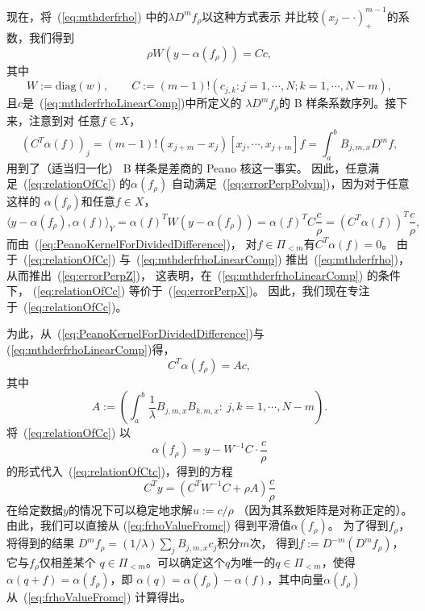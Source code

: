 现在，将~(\ref{eq:mthderfrho}) 中的$\lambda D^{m}f_{\rho}$以这种方式表示
并比较$(x_{j}-\cdot)_{+}^{m-1}$的系数，我们得到
\begin{equation}
  \label{eq:relationOfCc}
  \rho W(y-\alpha(f_{\rho}))=Cc,
\end{equation}
其中
\begin{displaymath}
  W:=\text{diag}(w),\qquad
  C:=(m-1)!(c_{j,k}:j=1,\cdots,N;k=1,\cdots,N-m),
\end{displaymath}
且$c$是~(\ref{eq:mthderfrhoLinearComp})中所定义的
$\lambda D^{m}f_{\rho}$的 B 样条系数序列。接下来，注意到对
任意$f\in X$，
\begin{equation}
  \label{eq:PeanoKernelForDividedDifference}
  (C^{T}\alpha(f))_{j}
  =(m-1)!(x_{j+m}-x_{j})[x_{j},\cdots,x_{j+m}]f
  =\int_{a}^{b}B_{j,m,x}D^{m}f,
\end{equation}
用到了（适当归一化） B 样条是差商的 Peano 核这一事实。
因此，任意满足~(\ref{eq:relationOfCc}) 的$\alpha(f_{\rho})$
自动满足~(\ref{eq:errorPerpPolym})，因为对于任意这样的
$\alpha(f_{\rho})$和任意$f\in X$，
\begin{displaymath}
  \langle y-\alpha(f_{\rho}),\alpha(f) \rangle_{Y}
  =\alpha(f)^{T}W(y-\alpha(f_{\rho}))
  =\alpha(f)^{T}C \frac{c}{\rho}
  =(C^{T}\alpha(f))^{T}\frac{c}{\rho},
\end{displaymath}
而由~(\ref{eq:PeanoKernelForDividedDifference})，
对$f\in\Pi_{<m}$有$C^{T}\alpha(f)=0$。
由于~(\ref{eq:relationOfCc}) 与~(\ref{eq:mthderfrhoLinearComp})
推出~(\ref{eq:mthderfrho})，从而推出~(\ref{eq:errorPerpZ})，
这表明，在~(\ref{eq:mthderfrhoLinearComp}) 的条件下，
(\ref{eq:relationOfCc}) 等价于~(\ref{eq:errorPerpX})。
因此，我们现在专注于~(\ref{eq:relationOfCc})。

为此，从~(\ref{eq:PeanoKernelForDividedDifference})与
(\ref{eq:mthderfrhoLinearComp})得，
\begin{equation}
  \label{eq:relationOfCtc}
  C^{T}\alpha(f_{\rho})=Ac,
\end{equation}
其中
\begin{displaymath}
  A:= \left( \int_{a}^{b}\frac{1}{\lambda}B_{j,m,x}B_{k,m,x}:\
  j,k = 1,\cdots, N-m \right).
\end{displaymath}
将~(\ref{eq:relationOfCc}) 以
\begin{equation}
  \label{eq:frhoValueFromc}
  \alpha(f_{\rho})=y-W^{-1}C\cdot \frac{c}{\rho}
\end{equation}
的形式代入~(\ref{eq:relationOfCtc})，得到的方程
\begin{equation}
  \label{eq:lineareqnOfc}
  C^{T}y=(C^{T}W^{-1}C+\rho A)\frac{c}{\rho}
\end{equation}
在给定数据$y$的情况下可以稳定地求解$u:=c/\rho$
（因为其系数矩阵是对称正定的）。由此，我们可以直接从
(\ref{eq:frhoValueFromc}) 得到平滑值$\alpha(f_{\rho})$。
为了得到$f_{\rho}$，将得到的结果
$D^{m}f_{\rho}=(1/\lambda)\sum_{j}B_{j,m,x}c_{j}$积分$m$次，
得到$f:=D^{-m}(D^{m}f_{\rho})$，它与$f_{\rho}$仅相差某个
$q\in\Pi_{<m}$。可以确定这个$q$为唯一的$q\in\Pi_{<m}$，使得
$\alpha(q+f)=\alpha(f_{\rho})$，即
$\alpha(q)=\alpha(f_{\rho})-\alpha(f)$，其中向量$\alpha(f_{\rho})$
从~(\ref{eq:frhoValueFromc}) 计算得出。

